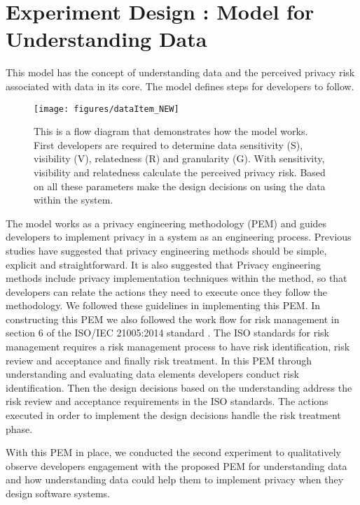 \documentclass{sigchi}
\begin{document}
\section {Experiment Design : Model for Understanding Data}

This model has the concept of understanding data and the perceived privacy risk associated with data in its core. The model defines steps for developers to follow.

\begin{figure*}[h]
\begin{center}
\texttt{[image: figures/dataItem\_NEW]}
\caption{This is a flow diagram that demonstrates how the model works. First developers are required to determine data sensitivity (S), visibility (V), relatedness (R) and granularity (G). With sensitivity, visibility and relatedness calculate the perceived privacy risk. Based on all these parameters make the design decisions on using the data within the system.}
\end{center}
\end{figure*} 


The model works as a privacy engineering methodology (PEM) and guides developers to implement privacy in a system as an engineering process. Previous studies have suggested that privacy engineering methods should be simple, explicit and straightforward. It is also suggested that Privacy engineering methods include privacy implementation techniques within the method, so that developers can relate the actions they need to execute once they follow the methodology. We followed these guidelines in implementing this PEM. In constructing this PEM we also followed the work flow for risk management in section 6 of the ISO/IEC 21005:2014 standard \cite {iso2014risk}. The ISO standards for risk management requires a risk management process to have risk identification, risk review and acceptance and finally risk treatment. In this PEM through understanding and evaluating data elements developers conduct risk identification. Then the design decisions based on the understanding address the risk review and acceptance requirements in the ISO standards. The actions executed in order to implement the design decisions handle the risk treatment phase.

With this PEM in place, we conducted the second experiment to qualitatively observe developers engagement with the proposed PEM for understanding data and how understanding data could help them to implement privacy when they design software systems.
\end{document}
